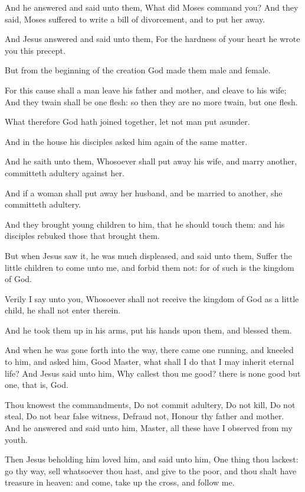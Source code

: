 \verse And he answered and said unto them, What did Moses command you?  \verse And they said, Moses suffered to write a bill of divorcement, and to put her away.

\verse And Jesus answered and said unto them, For the hardness of your heart he wrote you this precept.

\verse But from the beginning of the creation God made them male and female.

\verse For this cause shall a man leave his father and mother, and cleave to his wife; \verse And they twain shall be one flesh: so then they are no more twain, but one flesh.

\verse What therefore God hath joined together, let not man put asunder.

\verse And in the house his disciples asked him again of the same matter.

\verse And he saith unto them, Whosoever shall put away his wife, and marry another, committeth adultery against her.

\verse And if a woman shall put away her husband, and be married to another, she committeth adultery.

\verse And they brought young children to him, that he should touch them: and his disciples rebuked those that brought them.

\verse But when Jesus saw it, he was much displeased, and said unto them, Suffer the little children to come unto me, and forbid them not: for of such is the kingdom of God.

\verse Verily I say unto you, Whosoever shall not receive the kingdom of God as a little child, he shall not enter therein.

\verse And he took them up in his arms, put his hands upon them, and blessed them.

\verse And when he was gone forth into the way, there came one running, and kneeled to him, and asked him, Good Master, what shall I do that I may inherit eternal life?  \verse And Jesus said unto him, Why callest thou me good? there is none good but one, that is, God.

\verse Thou knowest the commandments, Do not commit adultery, Do not kill, Do not steal, Do not bear false witness, Defraud not, Honour thy father and mother.  \verse And he answered and said unto him, Master, all these have I observed from my youth.

\verse Then Jesus beholding him loved him, and said unto him, One thing thou lackest: go thy way, sell whatsoever thou hast, and give to the poor, and thou shalt have treasure in heaven: and come, take up the cross, and follow me.

